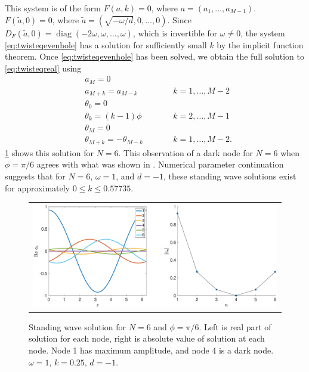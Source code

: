 \documentclass[12pt]{article}
\DeclareMathOperator{\diag}{diag}
\begin{document}
This system is of the form $F(a,k) = 0$, where $a = (a_1, \dots, a_{M-1})$. $F(\tilde{a}, 0) = 0$, where $\tilde{a} = (\sqrt{-\omega/d}, 0, \dots, 0)$. Since $D_F(\tilde{a}, 0) = \diag(-2\omega,\omega, \dots, \omega)$, which is invertible for $\omega \neq 0$, the system \cref{eq:twisteqevenhole} has a solution for sufficiently small $k$ by the implicit function theorem. Once \cref{eq:twisteqevenhole} has been solved, we obtain the full solution to \cref{eq:twisteqreal} using
\begin{align*}
&a_M = 0 \\
&a_{M+k} = a_{M-k} && \qquad k = 1, \dots, M-2 \\
&\theta_0 = 0 \\
&\theta_k = (k-1)\phi && \qquad  k = 2, \dots, M-1 \\
&\theta_M = 0 \\
&\theta_{M+k} = -\theta_{M-k} && \qquad k = 1, \dots, M-2.
\end{align*}
\cref{fig:evenhole6} shows this solution for $N=6$. This observation of a dark node for $N = 6$ when $\phi = \pi/6$ agrees with what was shown in \cite{castro2016}. Numerical parameter continuation suggests that for $N=6$, $\omega = 1$, and $d=-1$, these standing wave solutions exist for approximately $0 \leq k \leq 0.57735$.

\begin{figure}[H]
\begin{center}
\begin{tabular}{c}
\includegraphics[width=15cm]{images/evenhole6.eps}
\end{tabular}
\end{center}
\caption{Standing wave solution for $N = 6$ and $\phi = \pi/6$. Left is real part of solution for each node, right is absolute value of solution at each node. Node 1 has maximum amplitude, and node 4 is a dark node. $\omega = 1$, $k = 0.25$, $d=-1$.}
\label{fig:evenhole6}
\end{figure}
\end{document}
